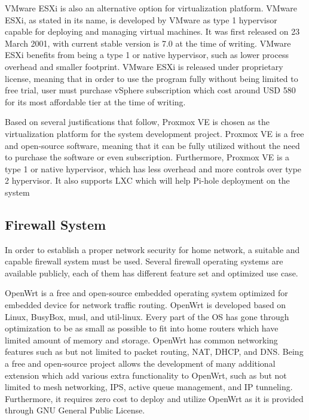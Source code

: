 \documentclass[../index.tex]{subfiles}
\begin{document}
VMware ESXi is also an alternative option for virtualization platform. VMware ESXi, as stated in its
name, is developed by VMware as type 1 hypervisor capable for deploying and managing virtual
machines. It was first released on 23 March 2001, with current stable version is 7.0 at the time of
writing. VMware ESXi benefits from being a type 1 or native hypervisor, such as lower process
overhead and smaller footprint. VMware ESXi is released under proprietary license, meaning that in
order to use the program fully without being limited to free trial, user must purchase vSphere
subscription which cost around USD 580 for its most affordable tier at the time of writing.

Based on several justifications that follow, Proxmox VE is chosen as the virtualization platform for
the system development project. Proxmox VE is a free and open-source software, meaning that it can
be fully utilized without the need to purchase the software or even subscription. Furthermore,
Proxmox VE is a type 1 or native hypervisor, which has less overhead and more controls over type 2
hypervisor. It also supports LXC which will help Pi-hole deployment on the system

\subsection{Firewall System}

In order to establish a proper network security for home network, a suitable and capable firewall
system must be used. Several firewall operating systems are available publicly, each of them has
different feature set and optimized use case.

OpenWrt is a free and open-source embedded operating system optimized for embedded device for
network traffic routing. OpenWrt is developed based on Linux, BusyBox, musl, and util-linux. Every
part of the OS has gone through optimization to be as small as possible to fit into home routers
which have limited amount of memory and storage. OpenWrt has common networking features such as but
not limited to packet routing, NAT, DHCP, and DNS. Being a free and open-source project allows the
development of many additional extension which add various extra functionality to OpenWrt, such as
but not limited to mesh networking, IPS, active queue management, and IP tunneling. Furthermore, it
requires zero cost to deploy and utilize OpenWrt as it is provided through GNU General Public
License.
\end{document}
